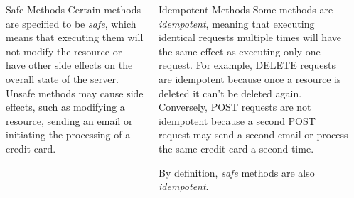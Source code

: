 \documentclass[final,table]{beamer}
\begin{document}
\begin{frame}{}
\begin{columns}
\begin{column}{0.9\textwidth}
        \begin{columns}
          \begin{column}{0.34\textwidth}
            \begin{block}{\huge{Safe Methods}}
              \Large
              Certain methods are specified to be \emph{safe}, which means that executing
              them will not modify the resource or have other side effects on the
              overall state of the server. Unsafe methods may cause side effects, such
              as modifying a resource, sending an email or initiating the processing of
              a credit card.
            \end{block}
          \end{column}
          \begin{column}{0.64\textwidth}
            \begin{block}{\huge{Idempotent Methods}}
              \Large
              Some methods are \emph{idempotent}, meaning that executing identical
              requests multiple times will have the same effect as executing only one
              request. For example, DELETE requests are idempotent because once a
              resource is deleted it can't be deleted again. Conversely, POST requests
              are not idempotent because a second POST request may send a second email
              or process the same credit card a second time.

              By definition, \emph{safe} methods are also \emph{idempotent}.
            \end{block}
          \end{column}
        \end{columns}

      \end{column}
      \begin{column}{0.05\textwidth}
      \end{column}
    \end{columns}

  \end{frame}
\end{document}
